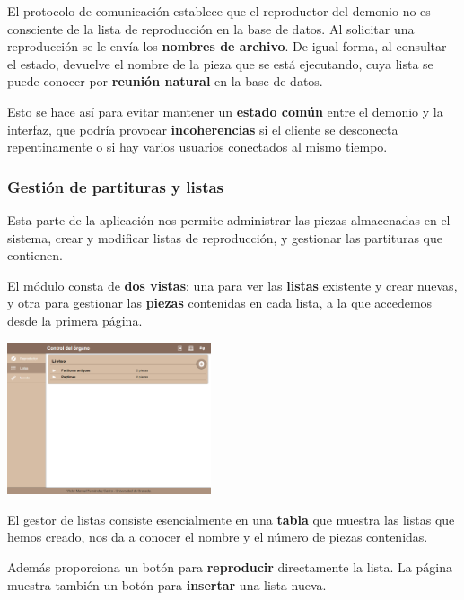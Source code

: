 \documentclass[10pt,a4paper]{article}
\begin{document}
	El protocolo de comunicación establece que el reproductor del demonio no es consciente de la lista de reproducción en la base de datos. Al solicitar una reproducción se le envía los \textbf{nombres de archivo}. De igual forma, al consultar el estado, devuelve el nombre de la pieza que se está ejecutando, cuya lista se puede conocer por \textbf{reunión natural} en la base de datos.
	
	Esto se hace así para evitar mantener un \textbf{estado común} entre el demonio y la interfaz, que podría provocar \textbf{incoherencias} si el cliente se desconecta repentinamente o si hay varios usuarios conectados al mismo tiempo.
	
	\subsubsection*{Gestión de partituras y listas}
	
	Esta parte de la aplicación nos permite administrar las piezas almacenadas en el sistema, crear y modificar listas de reproducción, y gestionar las partituras que contienen.
	
	El módulo consta de \textbf{dos vistas}: una para ver las \textbf{listas} existente y crear nuevas, y otra para gestionar las \textbf{piezas} contenidas en cada lista, a la que accedemos desde la primera página.
	
	\begin{multicols}{2}
		\noindent
		\begin{center}
			\includegraphics[width=0.45\textwidth]{images/cap_listas} 
		\end{center}
		\columnbreak
		El gestor de listas consiste esencialmente en una \textbf{tabla} que muestra las listas que hemos creado, nos da a conocer el nombre y el número de piezas contenidas. 
		
		Además proporciona un botón para \textbf{reproducir} directamente la lista. La página muestra también un botón para \textbf{insertar} una lista nueva.
	\end{multicols}
	
\end{document}
